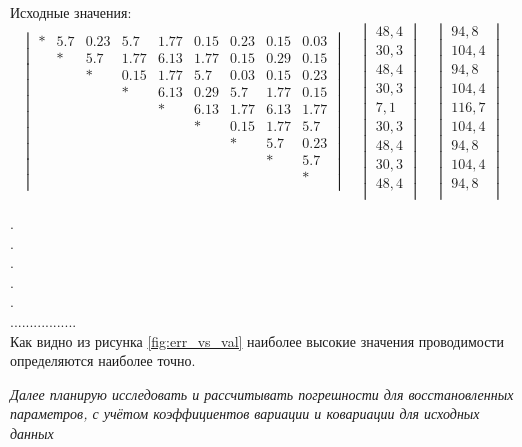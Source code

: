 \documentclass[14pt]{article}
\begin{document}
Исходные значения:
\begin{equation*} \label{m3x3_init}
	\begin{vmatrix}
		* &5.7 &0.23 &5.7 &1.77 &0.15 &0.23 &0.15 &0.03\\
		&* &5.7 &1.77 &6.13 &1.77 &0.15 &0.29 &0.15\\
		& &* &0.15 &1.77 &5.7 &0.03 &0.15 &0.23\\
		& & &* &6.13 &0.29 &5.7 &1.77 &0.15\\
		& & & &* &6.13 &1.77 &6.13 &1.77\\
		& & & & &* &0.15 &1.77 &5.7\\
		& & & & & &* &5.7 &0.23\\
		& & & & & & &* &5.7\\
		& & & & & & & &*\\
	\end{vmatrix}\quad
	\begin{vmatrix}
		48,4  \\
		30,3  \\
		48,4  \\
		30,3  \\
		7,1  \\
		30,3  \\
		48,4  \\
		30,3  \\
		48,4  \\
	\end{vmatrix}\quad
	\begin{vmatrix}
	94,8 \\
	104,4 \\
	94,8 \\
	104,4 \\
	116,7 \\
	104,4 \\
	94,8 \\
	104,4 \\
	94,8 \\
	\end{vmatrix}
\end{equation*}

.\\
.\\
.\\
.\\
.\\
.................\\
Как видно из рисунка \ref{fig:err_vs_val} наиболее высокие значения проводимости определяются наиболее точно.

\textit{Далее планирую исследовать и рассчитывать погрешности для восстановленных параметров, с учётом коэффициентов вариации и ковариации для исходных данных}
\end{document}
